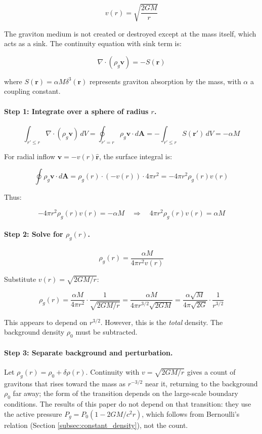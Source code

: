 \documentclass[12pt, a4paper]{article}
\begin{document}
\[
v(r) = \sqrt{\frac{2GM}{r}}
\]

The graviton medium is not created or destroyed except at the mass itself, which acts as a sink. The continuity equation with sink term is:

\[
\nabla \cdot (\rho_g \mathbf{v}) = -S(\mathbf{r})
\]

where \( S(\mathbf{r}) = \alpha M \delta^3(\mathbf{r}) \) represents graviton absorption by the mass, with \( \alpha \) a coupling constant.

\paragraph{Step 1: Integrate over a sphere of radius \( r \).}

\[
\int_{r' \leq r} \nabla \cdot (\rho_g \mathbf{v}) \, dV = \oint_{r' = r} \rho_g \mathbf{v} \cdot d\mathbf{A} = -\int_{r' \leq r} S(\mathbf{r'}) \, dV = -\alpha M
\]

For radial inflow \( \mathbf{v} = -v(r) \hat{\mathbf{r}} \), the surface integral is:

\[
\oint \rho_g \mathbf{v} \cdot d\mathbf{A} = \rho_g(r) \cdot (-v(r)) \cdot 4\pi r^2 = -4\pi r^2 \rho_g(r) v(r)
\]

Thus:

\[
-4\pi r^2 \rho_g(r) v(r) = -\alpha M \quad \Rightarrow \quad 4\pi r^2 \rho_g(r) v(r) = \alpha M
\]

\paragraph{Step 2: Solve for \( \rho_g(r) \).}

\[
\rho_g(r) = \frac{\alpha M}{4\pi r^2 v(r)}
\]

Substitute \( v(r) = \sqrt{2GM/r} \):

\[
\rho_g(r) = \frac{\alpha M}{4\pi r^2} \cdot \frac{1}{\sqrt{2GM/r}} = \frac{\alpha M}{4\pi r^{3/2} \sqrt{2GM}} = \frac{\alpha \sqrt{M}}{4\pi \sqrt{2G}} \cdot \frac{1}{r^{3/2}}
\]

This appears to depend on \( r^{3/2} \). However, this is the \textit{total} density. The background density \( \rho_0 \) must be subtracted.

\paragraph{Step 3: Separate background and perturbation.}

Let \( \rho_g(r) = \rho_0 + \delta \rho(r) \). Continuity with \( v = \sqrt{2GM/r} \) gives a count of gravitons that rises toward the mass as \( r^{-3/2} \) near it, returning to the background \( \rho_0 \) far away; the form of the transition depends on the large-scale boundary conditions. The results of this paper do not depend on that transition: they use the active pressure \( P_g = P_0(1 - 2GM/c^2 r) \), which follows from Bernoulli's relation (Section \ref{subsec:constant_density}), not the count. 
\end{document}
